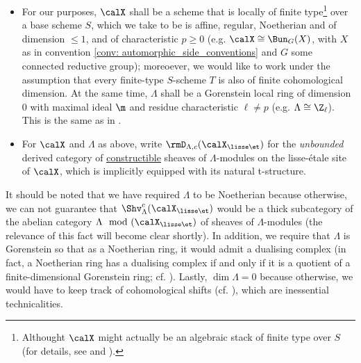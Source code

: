         \begin{convention} \label{conv: l_adic_sheaves_conventions}
            \noindent
            \begin{itemize}
                \item For our purposes, $\calX$ shall be a scheme that is locally of finite type\footnote{Althought $\calX$ might actually be an algebraic stack of finite type over $S$ (for details, see \cite{laszlo_olsson_adic_sheaves_on_artin_stacks_1} and \cite{laszlo_olsson_adic_sheaves_on_artin_stacks_2}).} over a base scheme $S$, which we take to be is affine, regular, Noetherian and of dimension $\leq 1$, and of characteristic $p \geq 0$ (e.g. $\calX \cong \Bun_G(X)$, with $X$ as in convention \ref{conv: automorphic_side_conventions} and $G$ some connected reductive group); moreoever, we would like to work under the assumption that every finite-type $S$-scheme $T$ is also of finite cohomological dimension. At the same time, $\Lambda$ shall be a Gorenstein local ring of dimension $0$ with maximal ideal $\m$ and residue  characteristic $\ell \not = p$ (e.g. $\Lambda \cong \Z_{\ell}$). This is the same as in \cite{laszlo_olsson_adic_sheaves_on_artin_stacks_1}.
                \item For $\calX$ and $\Lambda$ as above, write $\rmD_{\Lambda, c}(\calX_{\lisse\-\et})$ for the \textit{unbounded} derived category of \href{https://stacks.math.columbia.edu/tag/03RW}{\underline{constructible}} sheaves of $\Lambda$-modules on the lisse-\'etale site of $\calX$, which is implicitly equipped with its natural t-structure.
            \end{itemize}
        \end{convention}
        \begin{remark}
            It should be noted that we have required $\Lambda$ to be Noetherian because otherwise, we can not guarantee that $\Shv_{\Lambda}^c(\calX_{\lisse\-\et})$ would be a thick subcategory of the abelian category $\Lambda\mod(\calX_{\lisse\-\et})$ of sheaves of $\Lambda$-modules (the relevance of this fact will become clear shortly). In addition, we require that $\Lambda$ is Gorenstein so that as a Noetherian ring, it would admit a dualising complex (in fact, a Noetherian ring has a dualising complex if and only if it is a quotient of a finite-dimensional Gorenstein ring; cf. \cite[Corollary 1.4]{kawasaki_macaulayfication_of_noetherian_rings}). Lastly, $\dim \Lambda = 0$ because otherwise, we would have to keep track of cohomological shifts (cf. \cite[\href{https://stacks.math.columbia.edu/tag/0AWS}{Tag 0AWS} and \href{https://stacks.math.columbia.edu/tag/0B5A}{Tag 0B5A}]{stacks}), which are inessential technicalities.
        \end{remark}
        
